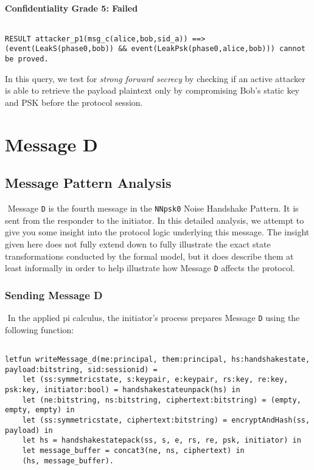 \paragraph{Confidentiality Grade 5: Failed}$ $
\begin{lstlisting}
RESULT attacker_p1(msg_c(alice,bob,sid_a)) ==> (event(LeakS(phase0,bob)) && event(LeakPsk(phase0,alice,bob))) cannot be proved.
\end{lstlisting}

In this query, we test for \emph{strong forward secrecy} by checking if an active attacker is able to retrieve the payload plaintext only by compromising Bob's static key and PSK before the protocol session.


\section{ Message D}

\subsection{Message Pattern Analysis}$ $
Message \texttt{D} is the fourth message in the \texttt{NNpsk0} Noise Handshake Pattern. It is sent from the responder to the initiator. In this detailed analysis, we attempt to give you some insight into the protocol logic underlying this message. The insight given here does not fully extend down to fully illustrate the exact state transformations conducted by the formal model, but it does describe them at least informally in order to help illustrate how Message \texttt{D} affects the protocol.


\subsubsection{Sending Message D}$ $
In the applied pi calculus, the initiator's process prepares Message \texttt{D} using the following function:


\begin{lstlisting}

letfun writeMessage_d(me:principal, them:principal, hs:handshakestate, payload:bitstring, sid:sessionid) =
	let (ss:symmetricstate, s:keypair, e:keypair, rs:key, re:key, psk:key, initiator:bool) = handshakestateunpack(hs) in
	let (ne:bitstring, ns:bitstring, ciphertext:bitstring) = (empty, empty, empty) in
	let (ss:symmetricstate, ciphertext:bitstring) = encryptAndHash(ss, payload) in
	let hs = handshakestatepack(ss, s, e, rs, re, psk, initiator) in
	let message_buffer = concat3(ne, ns, ciphertext) in
	(hs, message_buffer).

\end{lstlisting}


